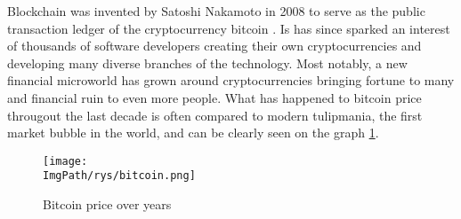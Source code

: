 \documentclass[a4paper,12pt,twoside,openany]{report}
\newcommand{\ImgPath}{.}
\begin{document}
Blockchain was invented by Satoshi Nakamoto in 2008 to serve as the public transaction ledger of the cryptocurrency bitcoin \cite{Bitcoin}.  Is has since sparked an interest of thousands of software developers creating their own cryptocurrencies and developing many diverse branches of the technology. Most notably, a new financial microworld has grown around cryptocurrencies bringing fortune to many and financial ruin to even more people. What has happened to bitcoin price througout the last decade is often compared to modern tulipmania, the first market bubble in the world, and can be clearly seen on the graph \ref{bitcoin}. 
\begin{figure}[!htbp]
	\begin{center}
\centering
\texttt{[image: \\ImgPath/rys/bitcoin.png]}
\end{center}
	\caption{Bitcoin price over years}
	\label{bitcoin}
\end{figure}
\end{document}
